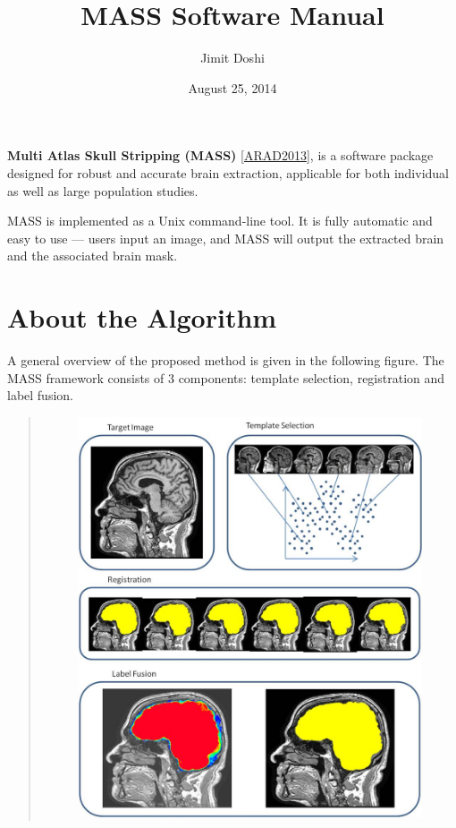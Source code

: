 \documentclass[letterpaper,10pt,english]{sphinxhowto}
\title{MASS Software Manual}
\date{August 25, 2014}
\author{Jimit Doshi}
\begin{document}
\maketitle
\tableofcontents
{}\label{index::doc}\pagebreak\pagestyle{headings}


\textbf{Multi Atlas Skull Stripping (MASS)}
{[}\href{http://www.sciencedirect.com/science/article/pii/S1076633213004182}{ARAD2013}{]},
is a software package designed for robust and accurate brain extraction, applicable for both individual as well as large population studies.

MASS is implemented as a Unix command-line tool. It is fully automatic and easy to use --- users input
an image, and MASS will output the extracted brain and the associated brain mask.
\pagebreak

\section{About the Algorithm}
\label{about:overview}\label{about::doc}\label{about:about-the-algorithm}
A general overview of the proposed method is given in the following figure.
The MASS framework consists of 3 components: template selection, registration and
label fusion.
\label{about:fig-framework}\begin{quote}
\begin{figure}[htbp]
\centering

\includegraphics[width=0.900\linewidth]{Figure1_OutlineOfMethod.jpg}
\end{figure}
\end{quote}
\end{document}
